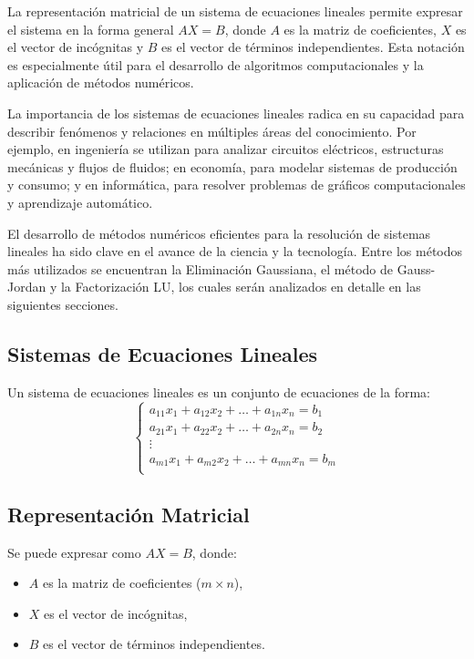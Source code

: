 \documentclass[12pt]{article}
\begin{document}
La representación matricial de un sistema de ecuaciones lineales permite expresar el sistema en la forma general $AX = B$, donde $A$ es la matriz de coeficientes, $X$ es el vector de incógnitas y $B$ es el vector de términos independientes. Esta notación es especialmente útil para el desarrollo de algoritmos computacionales y la aplicación de métodos numéricos.

La importancia de los sistemas de ecuaciones lineales radica en su capacidad para describir fenómenos y relaciones en múltiples áreas del conocimiento. Por ejemplo, en ingeniería se utilizan para analizar circuitos eléctricos, estructuras mecánicas y flujos de fluidos; en economía, para modelar sistemas de producción y consumo; y en informática, para resolver problemas de gráficos computacionales y aprendizaje automático.

El desarrollo de métodos numéricos eficientes para la resolución de sistemas lineales ha sido clave en el avance de la ciencia y la tecnología. Entre los métodos más utilizados se encuentran la Eliminación Gaussiana, el método de Gauss-Jordan y la Factorización LU, los cuales serán analizados en detalle en las siguientes secciones.

\subsection{Sistemas de Ecuaciones Lineales}
Un sistema de ecuaciones lineales es un conjunto de ecuaciones de la forma:
\begin{equation*}
\begin{cases}
a_{11}x_1 + a_{12}x_2 + \dots + a_{1n}x_n = b_1 \\
a_{21}x_1 + a_{22}x_2 + \dots + a_{2n}x_n = b_2 \\
\vdots \\
a_{m1}x_1 + a_{m2}x_2 + \dots + a_{mn}x_n = b_m \\
\end{cases}
\end{equation*}

\subsection{Representación Matricial}
Se puede expresar como $AX = B$, donde:
\begin{itemize}
    \item $A$ es la matriz de coeficientes ($m \times n$),
    \item $X$ es el vector de incógnitas,
    \item $B$ es el vector de términos independientes.
\end{itemize}
\end{document}
